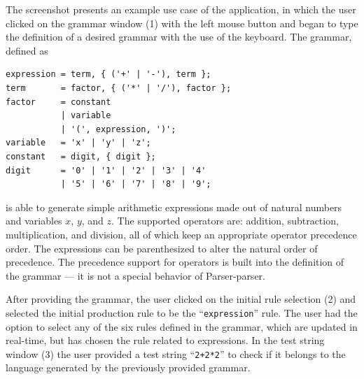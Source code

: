 \documentclass[english,bachelors,forcepolishlogotype]{wizthesis}
\newcommand{\thisproject}{Parser-parser}
\begin{document}
The screenshot presents an example use case of the application, in which the
user clicked on the grammar window (1) with the left mouse button and began to
type the definition of a desired grammar with the use of the keyboard. The
grammar, defined as
\begin{verbatim}
expression = term, { ('+' | '-'), term };
term       = factor, { ('*' | '/'), factor };
factor     = constant
           | variable
           | '(', expression, ')';
variable   = 'x' | 'y' | 'z';
constant   = digit, { digit };
digit      = '0' | '1' | '2' | '3' | '4'
           | '5' | '6' | '7' | '8' | '9';
\end{verbatim}
is able to generate simple arithmetic expressions made out of natural numbers
and variables $x$, $y$, and $z$. The supported operators are: addition,
subtraction, multiplication, and division, all of which keep an appropriate
operator precedence order. The expressions can be parenthesized to alter the
natural order of precedence. The precedence support for operators is built into
the definition of the grammar --- it is not a special behavior of
\thisproject{}.

After providing the grammar, the user clicked on the initial rule selection (2)
and selected the initial production rule to be the ``\texttt{expression}'' rule.
The user had the option to select any of the six rules defined in the grammar,
which are updated in real-time, but has chosen the rule related to expressions.
In the test string window (3) the user provided a test string ``\texttt{2+2*2}''
to check if it belongs to the language generated by the previously provided
grammar.
\end{document}
